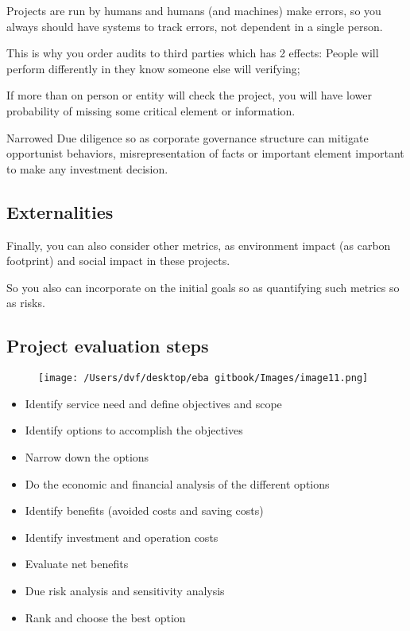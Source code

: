 \documentclass[]{book}
\providecommand{\tightlist}{%
  \setlength{\itemsep}{0pt}\setlength{\parskip}{0pt}}
\theoremstyle{definition}
\theoremstyle{definition}
\theoremstyle{definition}
\theoremstyle{remark}
\begin{document}
Projects are run by humans and humans (and machines) make errors, so you
always should have systems to track errors, not dependent in a single
person.

This is why you order audits to third parties which has 2 effects:
People will perform differently in they know someone else will
verifying;

If more than on person or entity will check the project, you will have
lower probability of missing some critical element or information.

Narrowed Due diligence so as corporate governance structure can mitigate
opportunist behaviors, misrepresentation of facts or important element
important to make any investment decision.

\subsection{Externalities}\label{externalities}

Finally, you can also consider other metrics, as environment impact (as
carbon footprint) and social impact in these projects.

So you also can incorporate on the initial goals so as quantifying such
metrics so as risks.

\subsection{Project evaluation steps}\label{project-evaluation-steps}

\begin{figure}[htbp]
\centering
\texttt{[image: /Users/dvf/desktop/eba gitbook/Images/image11.png]}
\caption{}
\end{figure}

\begin{itemize}
\tightlist
\item
  Identify service need and define objectives and scope
\item
  Identify options to accomplish the objectives
\item
  Narrow down the options
\item
  Do the economic and financial analysis of the different options
\item
  Identify benefits (avoided costs and saving costs)
\item
  Identify investment and operation costs
\item
  Evaluate net benefits
\item
  Due risk analysis and sensitivity analysis
\item
  Rank and choose the best option
\end{itemize}
\end{document}
